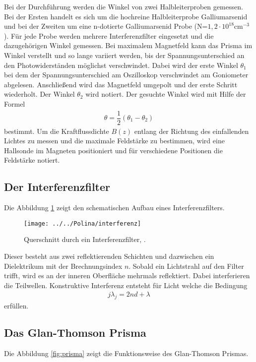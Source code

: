 Bei der Durchführung werden die Winkel von zwei Halbleiterproben gemessen. Bei der Ersten handelt es sich um die hochreine Halbleiterprobe Galliumarsenid und bei der Zweiten um eine n-dotierte Galliumarsenid Probe (N=$1,2\cdot 10^{18}\text{cm}^{-3}$). Für jede Probe werden mehrere Interferenzfilter eingesetzt und die dazugehörigen Winkel gemessen.  Bei maximalem Magnetfeld kann das Prisma im Winkel verstellt und so lange variiert werden, bis der Spannungsunterschied an den Photowiderständen möglichst verschwindet. Dabei wird der erste Winkel $\theta_1$ bei dem der Spannungsunterschied am Oszilloskop verschwindet am Goniometer abgelesen. Anschließend wird das Magnetfeld umgepolt und der erste Schritt wiederholt. Der Winkel $\theta_2$ wird notiert. Der gesuchte Winkel wird mit Hilfe der Formel 
\begin{align}
\theta=\dfrac{1}{2}(\theta_1-\theta_2)
\end{align}
bestimmt. Um die Kraftflussdichte $B(z)$ entlang der Richtung des einfallenden Lichtes zu messen und die maximale Feldstärke zu bestimmen, wird eine Hallsonde im Magneten positioniert und für verschiedene Positionen die Feldstärke notiert. 
\subsection{Der Interferenzfilter}

Die Abbildung \ref{fig:interferenz} zeigt den schematischen Aufbau eines Interferenzfilters.

\begin{figure}[h!]
	\centering
	\texttt{[image: ../../Polina/interferenz]}
	\caption{Querschnitt durch ein Interferenzfilter, \cite{anleitungV46}.}
	\label{fig:interferenz}
\end{figure}

Dieser besteht aus zwei reflektierenden Schichten und dazwischen ein Dielektrikum mit der Brechnungsindex $n$. Sobald ein Lichtstrahl auf den Filter trifft, wird es an der inneren Oberfläche mehrmals reflektiert. Dabei interferieren die Teilwellen. Konstruktive Interferenz entsteht für Licht welche die Bedingung 
\begin{align}
j\lambda_j=2nd+\lambda
\end{align}
erfüllen. 
\subsection{Das Glan-Thomson Prisma}
Die Abbildung \ref{fig:prisma} zeigt die Funktionsweise des Glan-Thomson Prismas. 

